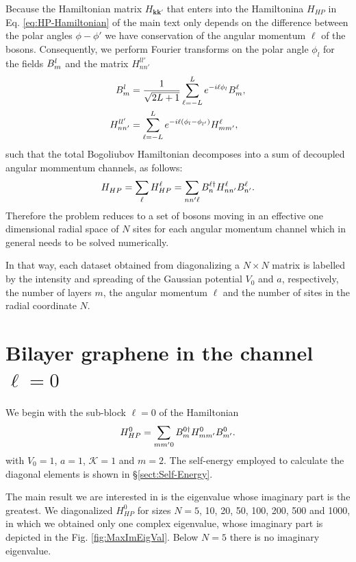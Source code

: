 \documentclass[english,aps,prd,nofootinbib,twocolumn]{revtex4-1}
\begin{document}
Because the Hamiltonian matrix $H_{\mathbf{k k'}}$ that enters into the Hamiltonina $H_{HP}$ in Eq. \eqref{eq:HP-Hamiltonian} of the main text only depends on the difference between the polar angles $\phi-\phi'$ we have conservation of the angular momentum $\ell$ of the bosons. Consequently, we perform Fourier transforms on the polar angle $\phi_{l}$ for the fields $B_{m}^{l\textcolor{white}{\dagger}}$ and the matrix $H_{nn'}^{ll'}$
\begin{equation}
\begin{split}
B_{m}^{l\textcolor{white}{\dagger}} &= 
\frac{1}{\sqrt{2L+1}}\sum_{\ell=-L}^{L}
e^{-i \ell \phi_{l}}B_{m}^{\ell} ,
\\
H_{nn'}^{ll'} &= \sum_{\ell=-L}^{L}
e^{-i \ell (\phi_{l }-\phi_{l'})}
H_{mm'}^{\ell},
\end{split}
\end{equation}
such that the total Bogoliubov Hamiltonian decomposes into a sum of decoupled angular mommentum channels, as follows:
\begin{equation}
H_{HP}^{\textcolor{white}{\ell}} = \sum_{\ell}
H_{HP}^{\ell} = 
\sum_{nn'\ell}
B_{n  }^{\ell\textcolor{black}{\dagger}}
H_{nn'}^{\ell}
B_{n' }^{\ell}.
\end{equation}
Therefore the problem reduces to a set of bosons moving in an effective one dimensional radial space of $N$ sites for each angular momentum channel which in general needs to be solved numerically.	

In that way, each dataset obtained from diagonalizing a $N\times N$ matrix is labelled by the intensity and spreading of the Gaussian potential $V_{0}$ and $a$, respectively, the number of layers $m$, the angular momentum $\ell$ and the number of sites in the radial coordinate $N$.

\section{Bilayer graphene in the channel $\ell=0$}
We begin with the sub-block $\ell = 0$ of the Hamiltonian 
\begin{equation}
H_{HP}^{0} = 
\sum_{mm'0}
B_{m}^{0\textcolor{black}{\dagger}}
H_{mm'}^{0}
B_{m'}^{0}.
\end{equation}
with $V_{0}=1$, $a=1$, $\mathcal{K}=1$ and $m=2$. The self-energy employed to calculate the diagonal elements is shown in \S\ref{sect:Self-Energy}. 

The main result we are interested in is the eigenvalue whose imaginary part is the greatest. We diagonalized $H_{HP}^{0}$ for sizes $N=5$, 10, 20, 50, 100, 200, 500 and 1000, in which we obtained only one complex eigenvalue, whose imaginary part is depicted in the Fig. \ref{fig:MaxImEigVal}. Below $N=5$ there is no imaginary eigenvalue. 
\end{document}
